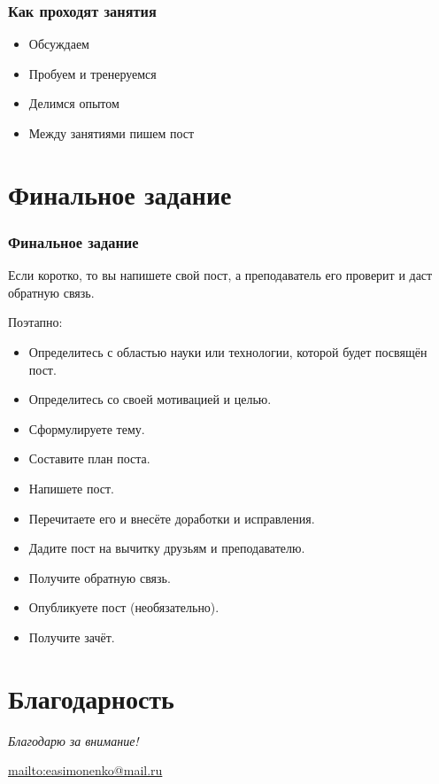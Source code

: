\documentclass[12pt]{beamer}
\begin{document}
\begin{frame}
  \frametitle{Как проходят занятия}
  \begin{itemize}
  \item Обсуждаем
  \item Пробуем и тренеруемся
  \item Делимся опытом
  \item Между занятиями пишем пост
  \end{itemize}
\end{frame}

\section{Финальное задание}

\begin{frame}
  \frametitle{Финальное задание}
  Если коротко, то вы напишете свой пост, а преподаватель его проверит и даст обратную связь.
  \par Поэтапно:
  \begin{itemize}
  \item Определитесь с областью науки или технологии, которой будет посвящён пост.
  \item Определитесь со своей мотивацией и целью.
  \item Сформулируете тему.
  \item Составите план поста.
  \item Напишете пост.
  \item Перечитаете его и внесёте доработки и исправления.
  \item Дадите пост на вычитку друзьям и преподавателю.
  \item Получите обратную связь.
  \item Опубликуете пост (необязательно).
  \item Получите зачёт.
  \end{itemize}
\end{frame}

\section*{Благодарность}

\begin{frame}
  \center
  \textit{Благодарю за внимание!}
  
  \textbf{\textsl{\inserttitle}}

  \insertauthor

  \url{mailto:easimonenko@mail.ru}

  \insertinstitute
\end{frame}
\end{document}
